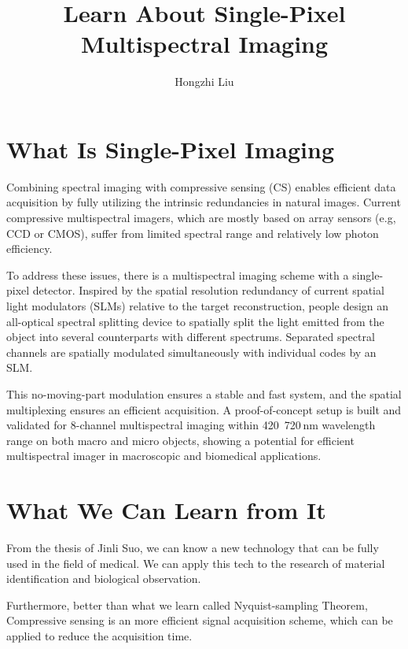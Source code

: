 \documentclass{article}
\author{Hongzhi Liu}
\title{Learn About Single-Pixel Multispectral Imaging}
\begin{document}
  \maketitle
  \section{What Is Single-Pixel Imaging}
  \par
  Combining spectral imaging with compressive sensing (CS) enables efficient data acquisition by fully utilizing the intrinsic redundancies in natural images. Current compressive multispectral imagers, which are mostly based on array sensors (e.g, CCD or CMOS), suffer from limited spectral range and relatively low photon efficiency.

  To address these issues, there is a multispectral imaging scheme with a single-pixel detector. Inspired by the spatial resolution redundancy of current spatial light modulators (SLMs) relative to the target reconstruction, people design an all-optical spectral splitting device to spatially split the light emitted from the object into several counterparts with different spectrums. Separated spectral channels are spatially modulated simultaneously with individual codes by an SLM.

  This no-moving-part modulation ensures a stable and fast system, and the spatial multiplexing ensures an efficient acquisition. A proof-of-concept setup is built and validated for 8-channel multispectral imaging within 420~720 nm wavelength range on both macro and micro objects, showing a potential for efficient multispectral imager in macroscopic and biomedical applications.
  \section{What We Can Learn from It}
  \par
  From the thesis of Jinli Suo, we can know a new technology that can be fully used in the field of medical. We can apply this tech to the research of material identification and biological observation.

  Furthermore, better than what we learn called Nyquist-sampling Theorem, Compressive sensing is an more efficient signal acquisition scheme, which can be applied to reduce the acquisition time.
\end{document}
